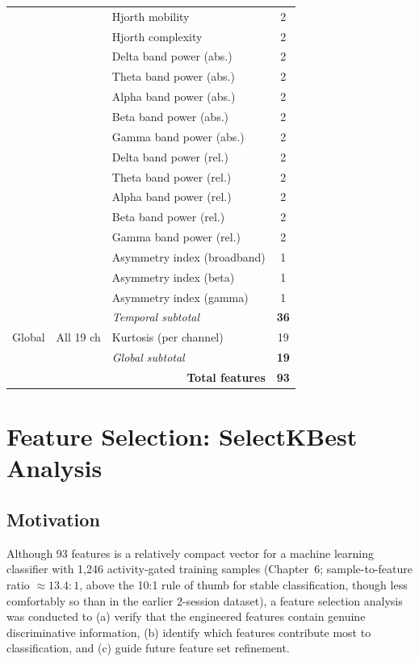 \begin{table}[htbp]
\begin{tabular}{p{1.5cm} p{2.5cm} p{4.0cm} c}
 & & Hjorth mobility                & 2 \\
 & & Hjorth complexity              & 2 \\
 & & Delta band power (abs.)        & 2 \\
 & & Theta band power (abs.)        & 2 \\
 & & Alpha band power (abs.)        & 2 \\
 & & Beta band power (abs.)         & 2 \\
 & & Gamma band power (abs.)        & 2 \\
 & & Delta band power (rel.)        & 2 \\
 & & Theta band power (rel.)        & 2 \\
 & & Alpha band power (rel.)        & 2 \\
 & & Beta band power (rel.)         & 2 \\
 & & Gamma band power (rel.)        & 2 \\
 & & Asymmetry index (broadband)    & 1 \\
 & & Asymmetry index (beta)         & 1 \\
 & & Asymmetry index (gamma)        & 1 \\
\multirow{1}{*}{}
 & & \textit{Temporal subtotal}     & \textbf{36} \\
\midrule
Global
 & All 19 ch
 & Kurtosis (per channel)          & 19 \\
 & & \textit{Global subtotal}      & \textbf{19} \\
\midrule
\multicolumn{3}{r}{\textbf{Total features}} & \textbf{93} \\
\bottomrule
\end{tabular}
\end{table}

\section{Feature Selection: SelectKBest Analysis}
\label{sec:fe_selection}

\subsection{Motivation}

Although 93 features is a relatively compact vector for a
machine learning classifier with 1{,}246 activity-gated
training samples (Chapter~6; sample-to-feature ratio
$\approx 13.4:1$, above the 10:1 rule of thumb for stable
classification, though less comfortably so than in the earlier
2-session dataset), a feature
selection analysis was conducted to (a) verify that the
engineered features contain genuine discriminative information,
(b) identify which features contribute most to classification,
and (c) guide future feature set refinement.

